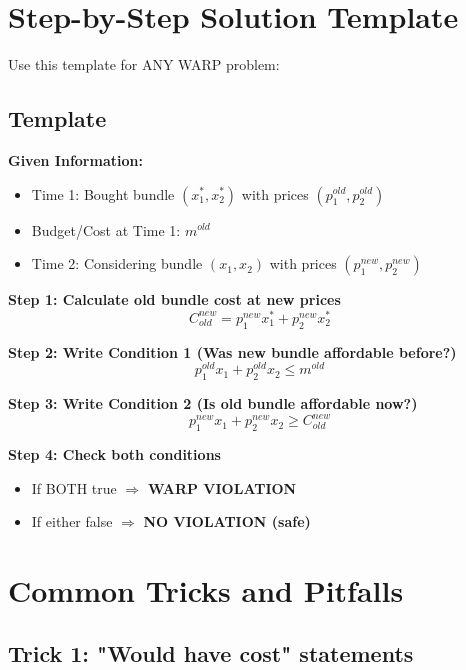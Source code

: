 \documentclass[11pt]{article}
\begin{document}
\newpage

\section{Step-by-Step Solution Template}

Use this template for ANY WARP problem:

\subsection{Template}

\begin{tcolorbox}[colback=yellow!10!white,colframe=orange!75!black,title=WARP Solution Template]

\textbf{Given Information:}
\begin{itemize}
\item Time 1: Bought bundle $(x_1^*, x_2^*)$ with prices $(p_1^{old}, p_2^{old})$
\item Budget/Cost at Time 1: $m^{old}$
\item Time 2: Considering bundle $(x_1, x_2)$ with prices $(p_1^{new}, p_2^{new})$
\end{itemize}

\textbf{Step 1: Calculate old bundle cost at new prices}
\[
C^{new}_{old} = p_1^{new} x_1^* + p_2^{new} x_2^*
\]

\textbf{Step 2: Write Condition 1 (Was new bundle affordable before?)}
\[
p_1^{old} x_1 + p_2^{old} x_2 \leq m^{old}
\]

\textbf{Step 3: Write Condition 2 (Is old bundle affordable now?)}
\[
p_1^{new} x_1 + p_2^{new} x_2 \geq C^{new}_{old}
\]

\textbf{Step 4: Check both conditions}
\begin{itemize}
\item If BOTH true $\Rightarrow$ \textbf{WARP VIOLATION}
\item If either false $\Rightarrow$ \textbf{NO VIOLATION (safe)}
\end{itemize}

\end{tcolorbox}

\newpage

\section{Common Tricks and Pitfalls}

\subsection{Trick 1: "Would have cost" statements}
\end{document}
